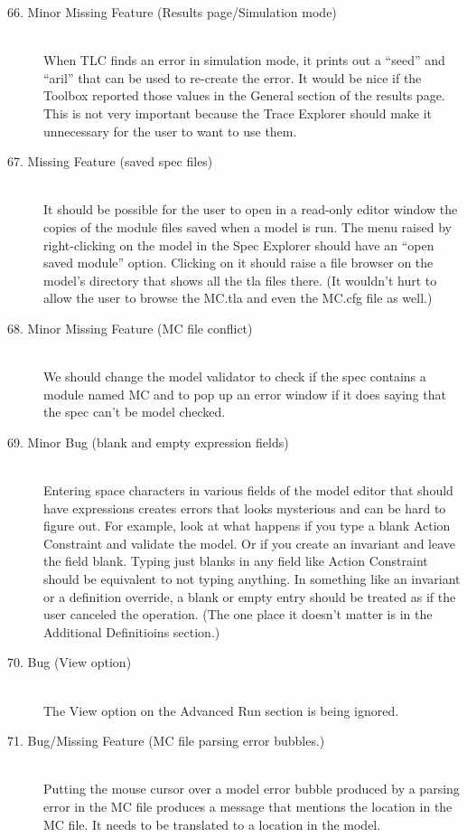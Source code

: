 \documentclass{article}
\begin{document}
\begin{description}
\item[66. Minor Missing Feature (Results page/Simulation mode)] \mbox{}\\
%
When TLC finds an error in simulation mode, it prints out a ``seed'' and
``aril'' that can be used to re-create the error.  It would be nice if
the Toolbox reported those values in the General section of the
results page.  This is not very important because the Trace Explorer
should make it unnecessary for the user to want to use them.

\item[67. Missing Feature (saved spec files)] \mbox{}\\
%
It should be possible for the user to open in a read-only editor
window the copies of the module files saved when a model is run.  The
menu raised by right-clicking on the model in the Spec Explorer should
have an ``open saved module'' option.  Clicking on it should raise a
file browser on the model's directory that shows all the tla files
there.  (It wouldn't hurt to allow the user to browse the MC.tla and
even the MC.cfg file as well.)

\item[68. Minor Missing Feature (MC file conflict)] \mbox{}\\
%
We should change the model validator to check if the spec contains a
module named MC and to pop up an error window if it does saying that
the spec can't be model checked.
  
\item[69. Minor Bug (blank and empty expression fields)] \mbox{}\\
%
Entering space characters in various fields of the model editor that
should have expressions creates errors that looks mysterious and can
be hard to figure out.  For example, look at what happens if you type
a blank Action Constraint and validate the model.  Or if you create an
invariant and leave the field blank.  Typing just blanks in any field
like Action Constraint should be equivalent to not typing anything.
In something like an invariant or a definition override, a blank or
empty entry should be treated as if the user canceled the operation.
(The one place it doesn't matter is in the Additional Definitioins
section.)

\item[70. Bug (View option)] \mbox{}\\
The View option on the Advanced Run section is being ignored.

\item[71. Bug/Missing Feature (MC file parsing error bubbles.)] \mbox{}\\
Putting the mouse cursor over a model error bubble produced by a 
parsing error in the MC file produces a message that mentions
the location in the MC file.  It needs to be translated to
a location in the model.


\end{description}
\end{document}
